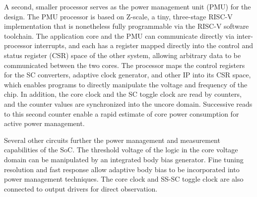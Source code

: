 \documentclass[graybox]{svmult}
\begin{document}
A second, smaller processor serves as the power management unit (PMU) for the design.
The PMU processor is based on Z-scale, a tiny, three-stage RISC-V implementation that is nonetheless fully programmable via the RISC-V software toolchain.
The application core and the PMU can communicate directly via inter-processor interrupts, and each has a register mapped directly into the control and status register (CSR) space of the other system, allowing arbitrary data to be communicated between the two cores.
The processor maps the control registers for the SC converters, adaptive clock generator, and other IP into its CSR space, which enables programs to directly manipulate the voltage and frequency of the chip.
In addition, the core clock and the SC toggle clock are read by counters, and the counter values are synchronized into the uncore domain.
Successive reads to this second counter enable a rapid estimate of core power consumption for active power management.

Several other circuits further the power management and measurement capabilities of the SoC.
The threshold voltage of the logic in the core voltage domain can be manipulated by an integrated body bias generator.
Fine tuning resolution and fast response allow adaptive body bias to be incorporated into power management techniques.
The core clock and SS-SC toggle clock are also connected to output drivers for direct observation.
\end{document}
